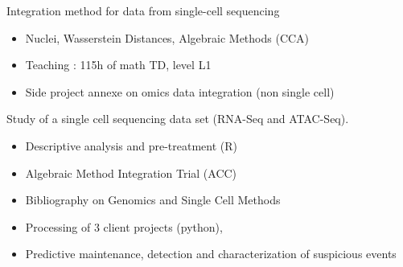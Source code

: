 \documentclass[10pt,a4paper]{altacv}
\begin{document}

 Integration method for data from single-cell sequencing
\begin{itemize}
\item Nuclei, Wasserstein Distances, Algebraic Methods (CCA)
\item Teaching : 115h of math TD, level L1
\item Side project annexe on omics data integration (non single cell)
\end{itemize}

Study of a single cell sequencing data set (RNA-Seq and ATAC-Seq). 
\begin{itemize}
\item Descriptive analysis and pre-treatment (R) 
\item Algebraic Method Integration Trial (ACC) 
\item Bibliography on Genomics and Single Cell Methods
\end{itemize}

{}

\begin{itemize}
\item Processing of 3 client projects (python), 
\item Predictive maintenance, detection and characterization of suspicious events
\end{itemize}
\end{document}
